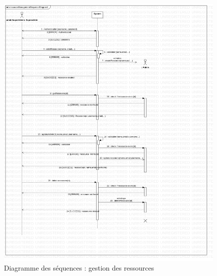     \begin{figure}[t]
        \centering
        \includegraphics[width=1\textwidth]{images/Analyse_des_besoins/ressourceManagementSequenceDiagram1.png}
        \caption{Diagramme des séquences : gestion des ressources}
        \label{fig:ressourceManagementSequenceDiagram1}
    \end{figure}